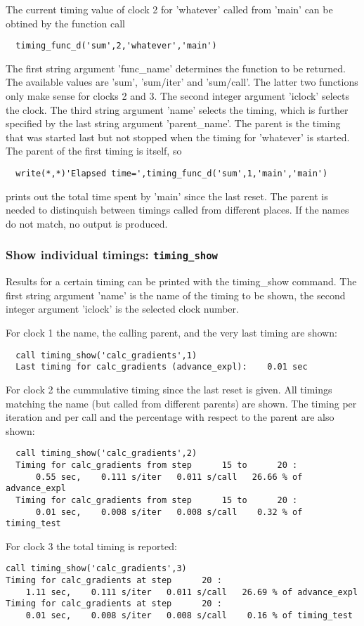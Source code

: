 \documentclass[10pt]{article}
\begin{document}
The current timing value of clock 2 for 'whatever' called from 'main'
can be obtined by the function call
\begin{verbatim}
  timing_func_d('sum',2,'whatever','main')
\end{verbatim}
The first string argument 'func\_name' determines the function
to be returned. The available values are 'sum', 'sum/iter' and 'sum/call'.
The latter two functions only make sense for clocks 2 and 3.
The second integer argument 'iclock' selects the clock.
The third string argument 'name' selects the timing,
which is further specified by the last string argument 'parent\_name'.
The parent is the timing that was started last but not stopped when
the timing for 'whatever' is started. The parent of the first timing
is itself, so
\begin{verbatim}
  write(*,*)'Elapsed time=',timing_func_d('sum',1,'main','main')
\end{verbatim}
prints out the total time spent by 'main' since the last reset. 
The parent is needed to distinquish between timings called from 
different places. If the names do not match, no output is produced.

\subsubsection{Show individual timings: {\tt timing\_show}}

Results for a certain timing can be printed with the timing\_show command.
The first string argument 'name' is the name of the timing to be shown, 
the second integer argument 'iclock' is the selected clock number.

For clock 1 the name, the calling parent, and the very last timing are shown:
\begin{verbatim}
  call timing_show('calc_gradients',1)
  Last timing for calc_gradients (advance_expl):    0.01 sec
\end{verbatim}
For clock 2 the cummulative timing since the last reset is given.
All timings matching the name (but called from different parents) are shown.
The timing per iteration and per call and the percentage
with respect to the parent are also shown:
{\small
\begin{verbatim}
  call timing_show('calc_gradients',2)
  Timing for calc_gradients from step      15 to      20 :
      0.55 sec,    0.111 s/iter   0.011 s/call   26.66 % of advance_expl
  Timing for calc_gradients from step      15 to      20 :
      0.01 sec,    0.008 s/iter   0.008 s/call    0.32 % of timing_test
\end{verbatim}
}
For clock 3 the total timing is reported:
{\small
\begin{verbatim}
call timing_show('calc_gradients',3)
Timing for calc_gradients at step      20 :
    1.11 sec,    0.111 s/iter   0.011 s/call   26.69 % of advance_expl
Timing for calc_gradients at step      20 :
    0.01 sec,    0.008 s/iter   0.008 s/call    0.16 % of timing_test
\end{verbatim}
}
\end{document}
